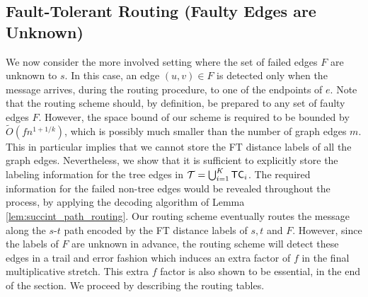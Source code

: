 \subsection{Fault-Tolerant Routing (Faulty Edges are Unknown)}\label{sec:route-unknown}
We now consider the more involved setting where the set of failed edges $F$ are unknown to $s$. In this case, an edge $(u,v) \in F$ is detected only when the message arrives, during the routing procedure, to one of the endpoints of $e$. Note that the routing scheme should, by definition, be prepared to any set of faulty edges $F$. However, the space bound of our scheme is required to be bounded by $\widetilde{O}(f n^{1+1/k})$, which is possibly much smaller than the number of graph edges $m$. This in particular implies that we cannot store the FT distance labels of all the graph edges. Nevertheless, we show that it is sufficient to explicitly store the labeling information for the tree edges in $\mathcal{T}=\bigcup_{i=1}^K \mathsf{TC}_i$. The required information for the failed non-tree edges would be revealed throughout the process, by applying the decoding algorithm of Lemma \ref{lem:succint_path_routing}.
Our routing scheme eventually routes the message along the $s$-$t$ path encoded by the FT distance labels of $s,t$ and $F$. However, since the labels of $F$ are unknown in advance, the routing scheme will detect these edges in a trail and error fashion which induces an extra factor of $f$ in the final multiplicative stretch. This extra $f$ factor is also shown to be essential, in the end of the section.
We proceed by describing the routing tables.  
%
